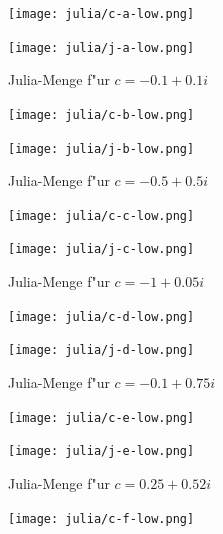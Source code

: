 \begin{refsection}

\begin{figure}
\begin{center}
\texttt{[image: julia/c-a-low.png]}

\bigskip

\texttt{[image: julia/j-a-low.png]}
\end{center}
\caption{Julia-Menge f"ur $c= -0.1+0.1i$\label{julia:a}}
\end{figure}

\begin{figure}
\begin{center}
\texttt{[image: julia/c-b-low.png]}

\bigskip

\texttt{[image: julia/j-b-low.png]}
\end{center}
\caption{Julia-Menge f"ur $c= -0.5+0.5i$\label{julia:b}}
\end{figure}

\begin{figure}
\begin{center}
\texttt{[image: julia/c-c-low.png]}

\bigskip

\texttt{[image: julia/j-c-low.png]}
\end{center}
\caption{Julia-Menge f"ur $c= -1+0.05i$\label{julia:c}}
\end{figure}

\begin{figure}
\begin{center}
\texttt{[image: julia/c-d-low.png]}

\bigskip

\texttt{[image: julia/j-d-low.png]}
\end{center}
\caption{Julia-Menge f"ur $c= -0.1+0.75i$\label{julia:d}}
\end{figure}

\begin{figure}
\begin{center}
\texttt{[image: julia/c-e-low.png]}

\bigskip

\texttt{[image: julia/j-e-low.png]}
\end{center}
\caption{Julia-Menge f"ur $c= 0.25+0.52i$\label{julia:e}}
\end{figure}

\begin{figure}
\begin{center}
\texttt{[image: julia/c-f-low.png]}


\end{center}
\end{figure}
\end{refsection}
